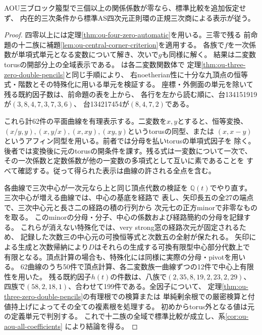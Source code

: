 \begin{theorem}[全三零台の全係数での比較仮定の除去]
\label{thm:ou-three-zero-automatic}
AOU三ブロック箙型で三個以上の関係係数が零なら、標準比較を追加仮定せず、
内在的三次条件から標準AS四次元正則環の正規三次商による表示が従う。
\end{theorem}
\begin{proof}
四零以上には定理\ref{thm:ou-four-zero-automatic}を用いる。三零で残る
前命題の十二族に補題\ref{lem:ou-central-corner-criterion}を適用する。
各族で$f$を一次係数が単項式単元となる変数について解き、次いで$g$も同様に解く。
結果は二変数torusの開部分上の全域表示である。
は各二変数関数体で
定理\ref{thm:ou-three-zero-double-pencils}と同じ手順により、
右noetherian性に十分な九頂点の恒等式・階数とその特殊化に用いる単元を検証する。
座標・外側面の単元を除いて残る既約因子数は、前命題の表を上から、
各行を左から読む順に、台134151919が$(3,8,4,7,3,7,3,6)$、
台134217454が$(8,4,7,2)$である。

これら計62件の平面曲線を有理表示する。二変数を$x,y$とすると、恒等変換、
$(x/y,y),(x,y/x),(x,xy),(xy,y)$というtorusの同型、または
$(x,x-y)$というアフィン同型を用いる。前者では分母を払いtorusの単項式因子を
除く。後者では変換後に元のtorusの開条件を課す。残る式は一変数について一次で、
その一次係数と定数係数が他の一変数の多項式として互いに素であることを
すべて確認する。従って得られた表示は曲線の許される全点を含む。

各曲線で三次中心が一次元なら上と同じ頂点代数の検証を
$\mathbb Q(t)$でやり直す。三次中心が増える曲線では、中心の基底を経路で
表し、矢印長五の全27の端点で、三次中心元と長さ二の経路の積の行列から
次元七の正方minorで非零なものを取る。
このminorの分母・分子、中心の係数および経路簡約の分母を記録する。
これらが消えない特殊化では、very strong窓の経路次元が固定されるため、
記録した次数三の中心元の可換恒等式と次数五の全射が保たれる。
矢印による生成と次数帰納により$D$はそれらの生成する可換有限型中心部分代数上で
有限となる。頂点計算の場合も、特殊化には同様に実際の分母・pivotを用いる。
62曲線のうち50件で頂点計算、各二変数族一曲線ずつの12件で中心上有限性を用いた。
残る既約因子$h(t)$の件数は、八族で$(2,35,8,19,2,23,2,29)$、
四族で$(58,2,18,1)$、合わせて199件である。全因子について、
定理\ref{thm:ou-three-zero-double-pencils}の有理根での検算または
単純剰余根での厳密検算と付値持上げによってその全ての複素根を処理する。
初めからtorus外となる値は元の定義単元で判別する。
これで十二族の全域で標準比較が成立し、系\ref{cor:ou-aou-all-coefficients}
により結論を得る。
\end{proof}

